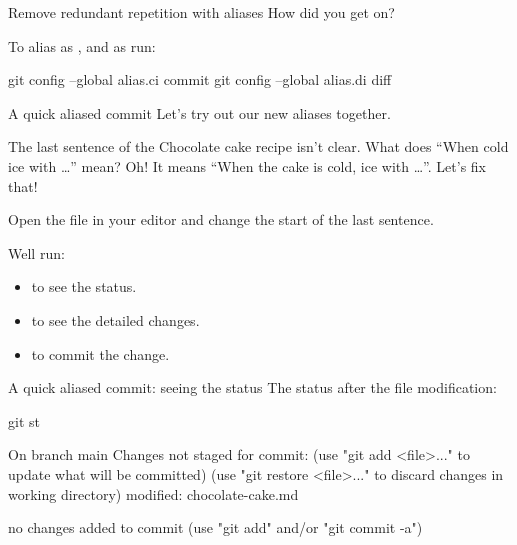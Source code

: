 \begin{frame}[fragile]{Remove redundant repetition with aliases}
    How did you get on?

    To alias  as , and  as  run:
    \begin{shellcode}
        git config --global alias.ci commit
        git config --global alias.di diff
    \end{shellcode}
\end{frame}

\begin{frame}[fragile]{A quick aliased commit}
    Let's try out our new aliases together.

    The last sentence of the Chocolate cake recipe isn't clear.  What does
    ``When cold ice with \ldots'' mean?  Oh!  It means ``When the cake is cold,
    ice with \ldots''.  Let's fix that!

    Open the file in your editor and change the start of the last sentence.

    Well run:
    \begin{itemize}
        \item {} to see the status.
        \item {} to see the detailed changes.
        \item {} to commit the change.
    \end{itemize}
\end{frame}

\begin{frame}[fragile]{A quick aliased commit: seeing the status}
    The status after the file modification:
    \begin{shellcode}
        git st
    \end{shellcode}
    \begin{outputcode}[autogobble=false]
On branch main
Changes not staged for commit:
  (use "git add <file>..." to update what will be committed)
  (use "git restore <file>..." to discard changes in working directory)
        modified:   chocolate-cake.md

no changes added to commit (use "git add" and/or "git commit -a")
    \end{outputcode}
\end{frame}


